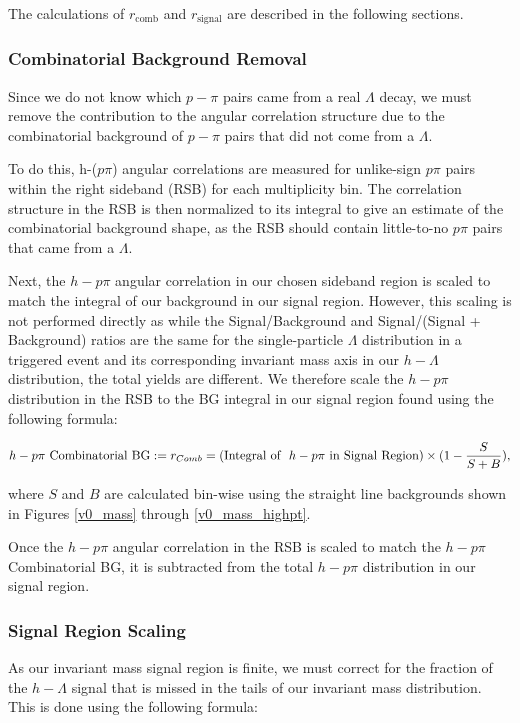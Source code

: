 \documentclass[ALICE,manyauthors]{ALICE_analysis_notes}
\begin{document}
The calculations of $r_{\text{comb}}$ and $r_{\text{signal}}$ are described in the following sections.

\subsubsection{Combinatorial Background Removal}
\label{removecomb_v0}
Since we do not know which $p-\pi$ pairs came from a real $\Lambda$ decay, we must remove the contribution to the angular correlation structure due to the combinatorial background of $p-\pi$ pairs that did not come from a $\Lambda$.

To do this, h-($p\pi$) angular correlations are measured for unlike-sign $p\pi$ pairs within the right sideband (RSB) for each multiplicity bin. The correlation structure in the RSB is then normalized to its integral to give an estimate of the combinatorial background shape, as the RSB should contain little-to-no $p\pi$ pairs that came from a $\Lambda$. 

Next, the $h-p\pi$ angular correlation in our chosen sideband region is scaled to match the integral of our background in our signal region. However, this scaling is not performed directly as while the Signal/Background and Signal/(Signal + Background) ratios are the same for the single-particle $\Lambda$ distribution in a triggered event and its corresponding invariant mass axis in our $h-\Lambda$ distribution, the total yields are different. We therefore scale the $h-p\pi$ distribution in the RSB to the BG integral in our signal region found using the following formula:

\begin{align}
	h-p\pi \text{\space Combinatorial BG} := r_{Comb} = (\text{Integral of \space} h-p\pi \text{\space in Signal Region}) \times (1 - \frac{S}{S+B}),
\end{align}

where $S$ and $B$ are calculated bin-wise using the straight line backgrounds shown in Figures \ref{v0_mass} through \ref{v0_mass_highpt}.

Once the $h-p\pi$ angular correlation in the RSB is scaled to match the $h-p\pi$ Combinatorial BG, it is subtracted from the total $h-p\pi$ distribution in our signal region. 

\subsubsection{Signal Region Scaling}
\label{signal_scaling}
As our invariant mass signal region is finite, we must correct for the fraction of the $h-\Lambda$ signal that is missed in the tails of our invariant mass distribution. This is done using the following formula:
\end{document}
